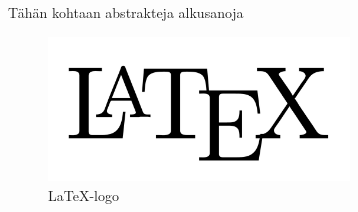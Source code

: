 \documentclass[12pt]{report} %
\begin{document}
    Tähän kohtaan abstrakteja alkusanoja

    \begin{figure}[H] %
        \centering
        \includegraphics[width=8cm]{latex.png}
        \caption{\LaTeX -logo} %
        \label{img:myimg.jpg} %
        \end{figure}
    

    
    
    
\end{document}
